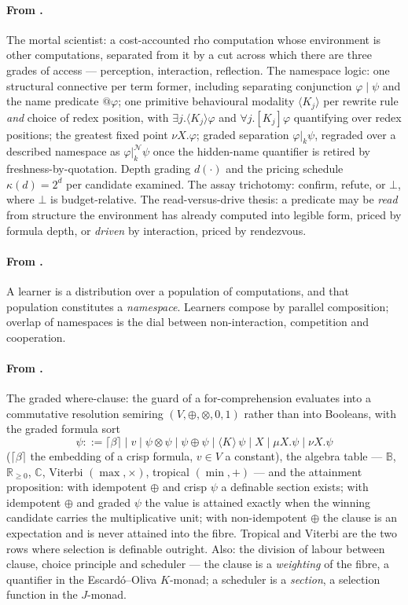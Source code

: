 \documentclass[11pt,a4paper]{article}
\makeatletter
\theoremstyle{plain}
\theoremstyle{definition}
\theoremstyle{remark}
\newcommand{\gK}[1]{\langle K_{#1}\rangle}
\newcommand{\Nsp}{\mathcal{N}}
\newcommand{\Val}{V}
\newcommand{\qq}[1]{@#1}
\newcommand{\sep}[2]{\mathbin{\big|^{#1}_{#2}}}
\makeatother
\begin{document}
\paragraph{From \cite{scientist,game}.} The mortal scientist: a cost-accounted
rho computation whose environment is other computations, separated from it by a
cut across which there are three grades of access --- perception, interaction,
reflection. The namespace logic: one structural connective per term former,
including separating conjunction $\varphi\mid\psi$ and the name predicate
$\qq{\varphi}$; one primitive behavioural modality $\gK{j}$ per rewrite rule
\emph{and} choice of redex position, with $\exists j.\gK{j}\varphi$ and
$\forall j.[K_j]\varphi$ quantifying over redex positions; the greatest fixed
point $\nu X.\varphi$; graded separation $\varphi \sep{}{k} \psi$, regraded over
a described namespace as $\varphi \sep{\Nsp}{k}\psi$ once the hidden-name
quantifier is retired by freshness-by-quotation. Depth grading $d(\cdot)$ and
the pricing schedule $\kappa(d) = 2^d$ per candidate examined. The assay
trichotomy: confirm, refute, or $\bot$, where $\bot$ is budget-relative. The
read-versus-drive thesis: a predicate may be \emph{read} from structure the
environment has already computed into legible form, priced by formula depth, or
\emph{driven} by interaction, priced by rendezvous.

\paragraph{From \cite{compose}.} A learner is a distribution over a population
of computations, and that population constitutes a \emph{namespace}. Learners
compose by parallel composition; overlap of namespaces is the dial between
non-interaction, competition and cooperation.

\paragraph{From \cite{gradedwhere,choicef}.} The graded where-clause: the guard
of a for-comprehension evaluates into a commutative resolution semiring
$(\Val,\oplus,\otimes,0,1)$ rather than into Booleans, with the graded formula
sort
\[
\psi ::= \lceil \beta \rceil \mid v \mid \psi\otimes\psi \mid \psi\oplus\psi
       \mid \gK{}{}\,\psi \mid X \mid \mu X.\psi \mid \nu X.\psi
\]
($\lceil\beta\rceil$ the embedding of a crisp formula, $v\in\Val$ a constant),
the algebra table --- $\mathbb{B}$, $\mathbb{R}_{\ge0}$, $\mathbb{C}$, Viterbi
$(\max,\times)$, tropical $(\min,+)$ --- and the attainment proposition: with
idempotent $\oplus$ and crisp $\psi$ a definable section exists; with idempotent
$\oplus$ and graded $\psi$ the value is attained exactly when the winning
candidate carries the multiplicative unit; with non-idempotent $\oplus$ the
clause is an expectation and is never attained into the fibre. Tropical and
Viterbi are the two rows where selection is definable outright. Also: the
division of labour between clause, choice principle and scheduler --- the clause
is a \emph{weighting} of the fibre, a quantifier in the Escard\'o--Oliva
$K$-monad; a scheduler is a \emph{section}, a selection function in the
$J$-monad.
\end{document}
